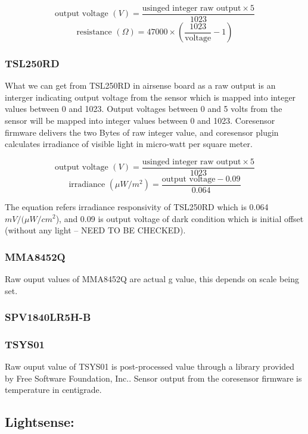 {\centering
 \[ \text{output voltage } (V) = \frac{\text{usinged integer raw output} \times 5}{1023} \] 
 \[ \text{resistance } (\Omega) = 47000 \times \left(\frac{1023}{\text{voltage}} - 1\right) \]
 \par
 }


\subsubsection{ TSL250RD}

What we can get from TSL250RD in airsense board as a raw output is an interger indicating output voltage from the sensor which is mapped into integer values between 0 and 1023. Output voltages between 0 and 5 volts from the sensor will be mapped into integer values between 0 and 1023. Coresensor firmware delivers the two Bytes of raw integer value, and coresensor plugin calculates irradiance of visible light in micro-watt per square meter.

{\centering
 \[ \text{output voltage }(V) = \frac{\text{usinged integer raw output} \times 5}{1023} \] 
 \[ \text{irradiance } (\mu W/m^2) = \frac{\text{output voltage} - 0.09}{0.064} \]
 \par
 }
 
\bigbreak
The equation refers irradiance responsivity of TSL250RD which is 0.064 \(mV/(\mu W/cm^2\)), and 0.09 is output voltage of dark condition which is initial offset (without any light -- NEED TO BE CHECKED).

\subsubsection{ MMA8452Q}

Raw ouput values of MMA8452Q are actual g value, this depends on scale being set.

\subsubsection{ SPV1840LR5H-B}

\subsubsection{ TSYS01}

Raw ouput value of TSYS01 is post-processed value through a library provided by  Free Software Foundation, Inc.. Sensor output from the coresensor firmware is temperature in centigrade.


\subsection{Lightsense:}
